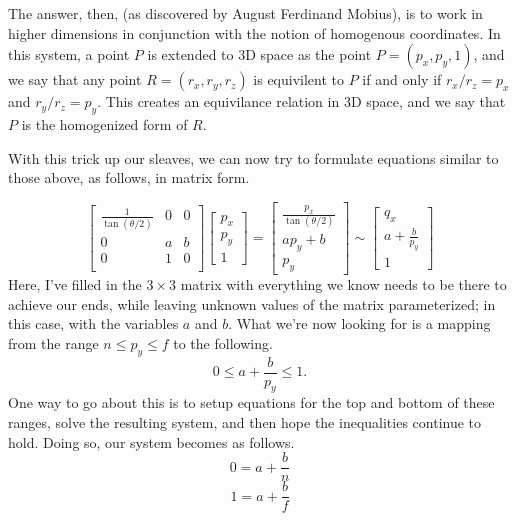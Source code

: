 \documentclass[12pt]{article}
\begin{document}
The answer, then, (as discovered by August Ferdinand Mobius), is to work in higher dimensions in conjunction with the notion of homogenous coordinates.  In this system, a point $P$ is extended to 3D space as the point $P=(p_x,p_y,1)$, and we say that any point $R=(r_x,r_y,r_z)$ is equivilent to $P$ if and only if $r_x/r_z=p_x$ and $r_y/r_z=p_y$.  This creates an equivilance relation in 3D space, and we say that $P$ is the homogenized form of $R$.

With this trick up our sleaves, we can now try to formulate equations similar to those above, as follows, in matrix form.

\begin{equation*}
\left[
\begin{array}{ccc}
\frac{1}{\tan(\theta/2)} & 0 & 0 \\
0 & a & b \\
0 & 1 & 0 \\
\end{array}
\right]\left[
\begin{array}{c}
p_x \\
p_y \\
1
\end{array}
\right] = \left[
\begin{array}{c}
\frac{p_x}{\tan(\theta/2)} \\
ap_y + b \\
p_y
\end{array}
\right] \sim \left[
\begin{array}{c}
q_x \\
a + \frac{b}{p_y} \\
1
\end{array}
\right]
\end{equation*}
Here, I've filled in the $3\times 3$ matrix with everything we know needs to be there to achieve our ends, while leaving unknown values of the matrix parameterized; in this case, with the variables $a$ and $b$.  What we're now looking for is a mapping from the range $n\leq p_y\leq f$ to the following.
\begin{equation*}
0\leq a + \frac{b}{p_y}\leq 1.
\end{equation*}
One way to go about this is to setup equations for the top and bottom of these ranges, solve the resulting system, and then hope the inequalities continue to hold.  Doing so, our system becomes as follows.
\begin{equation*}
0 = a + \frac{b}{n}
\end{equation*}
\begin{equation*}
1 = a + \frac{b}{f}
\end{equation*}
\end{document}
